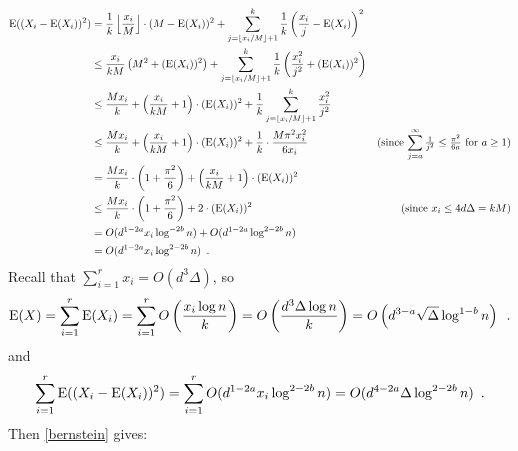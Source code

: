 \documentclass{patmorin}
\begin{document}
\begin{align*}
  \mathrm{E}((X_i-\mathrm{E}(X_i))^2)
  & = \frac{1}{k}\left\lfloor\frac{x_i}{M}\right\rfloor\cdot(M-\mathrm{E}(X_i))^2
    + \sum_{j=\lfloor x_i/M\rfloor+1}^k \frac{1}{k}\left(\frac{x_i}{j}-\mathrm{E}(X_i)\right)^2 \\
  & \le \frac{x_i}{kM}\left(M^2 + (\mathrm{E}(X_i))^2\right)
    + \sum_{j=\lfloor x_i/M\rfloor+1}^k \frac{1}{k}\left(\frac{x_i^2}{j^2}+(\mathrm{E}(X_i))^2\right) \\
  & \le \frac{M x_i}{k} + \left(\frac{x_i}{kM}+1\right)\cdot (\mathrm{E}(X_i))^2
      + \frac{1}{k}\sum_{j=\lfloor x_i/M\rfloor+1}^k \frac{x_i^2}{j^2} \\
  & \le \frac{M x_i}{k} + \left(\frac{x_i}{kM}+1\right)\cdot (\mathrm{E}(X_i))^2
      +  \frac{1}{k}\cdot\frac{M\pi^2x_i^2}{6 x_i}
     & \text{(since $\sum_{j=a}^{\infty} \tfrac{1}{j^2} \le \tfrac{\pi^2}{6a}$ for $a\ge 1$)} \\
  & = \frac{M x_i}{k}\cdot\left(1+\frac{\pi^2}{6}\right) + \left(\frac{x_i}{kM}+1\right)\cdot (\mathrm{E}(X_i))^2 \\
  & \le \frac{M x_i}{k}\cdot\left(1+\frac{\pi^2}{6}\right) + 2\cdot (\mathrm{E}(X_i))^2   & \text{(since $x_i\le 4d\Delta=kM$)} \\
 & = O(d^{1-2a}x_i\log^{-2b}n) + O(d^{1-2a}\log^{2-2b} n) \\
  & = O(d^{1-2a}x_i\log^{2-2b}n) \enspace .
\end{align*}
Recall that $\sum_{i=1}^r x_i = O(d^3\Delta)$, so
\[
  \mathrm{E}(X)
  = \sum_{i=1}^r \mathrm{E}(X_i)
  = \sum_{i=1}^r O\left(\frac{x_i\log n}{k}\right)
  = O\left(\frac{d^3\Delta\log n}{k}\right)
  = O\left(d^{3-a}\sqrt{\Delta}\log^{1-b} n\right) \enspace .
\]
and
\[
  \sum_{i=1}^r\mathrm{E}((X_i-\mathrm{E}(X_i))^2)
  = \sum_{i=1}^r O(d^{1-2a}x_i\log^{2-2b} n)
  = O(d^{4-2a}\Delta\log^{2-2b} n)  \enspace .
\]
Then \cref{bernstein} gives:
\end{document}
